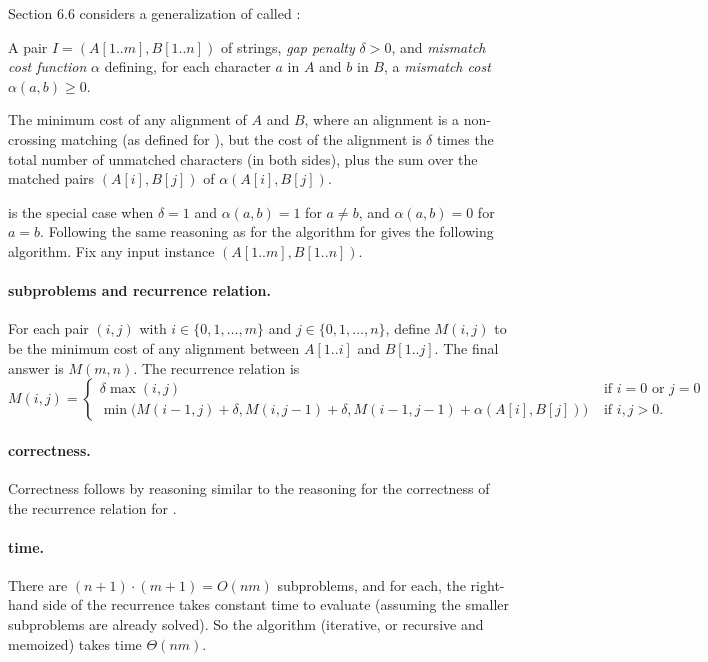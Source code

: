 \KT Section 6.6 considers a generalization of  called :

\begin{mylist}
\item[\bf input:]
  A pair $I=(A[1..m], B[1..n])$ of strings, \emph{gap penalty} $\delta>0$,
  and \emph{mismatch cost function} $\alpha$ defining,
  for each character $a$ in $A$ and $b$ in $B$,
  a \emph{mismatch cost} $\alpha(a, b)\ge 0$.

\item[\bf output:]
  The minimum cost of any alignment of $A$ and $B$,
  where an alignment is a non-crossing matching (as defined for ),
  but the cost of the alignment is $\delta$ times the total number of unmatched characters (in both sides),
  plus the sum over the matched pairs $(A[i], B[j])$ of $\alpha(A[i], B[j])$.
\end{mylist}
 is the special case when $\delta=1$
and $\alpha(a, b) = 1$ for $a\ne b$, and $\alpha(a, b) = 0$ for $a=b$.
Following the same reasoning as for the algorithm for 
gives the following algorithm.
Fix any input instance $(A[1..m], B[1..n])$.

\paragraph{subproblems and recurrence relation.}
For each pair $(i, j)$ with $i\in\{0,1,\ldots, m\}$ and $j\in\{0,1,\ldots,n\}$,
define $M(i, j)$ to be the minimum cost of any alignment between $A[1..i]$ and $B[1..j]$.
The final answer is $M(m, n)$.  The recurrence relation is
\[
  M(i, j) = \begin{cases}
    \delta \max(i, j) & \text{ if } i=0 \text{ or } j=0 \\
    \min \big(M(i-1, j) + \delta, M(i, j-1) + \delta, M(i-1, j-1) + \alpha(A[i], B[j])\big)  & \text{ if } i, j > 0.
  \end{cases}
\]

\paragraph{correctness.}  Correctness follows by reasoning similar to the reasoning
for the correctness of the recurrence relation for .

\paragraph{time.}
There are $(n+1)\cdot(m+1) = O(nm)$ subproblems,
and for each, the right-hand side of the recurrence takes
constant time to evaluate
(assuming the smaller subproblems are already solved).
So the algorithm (iterative, or recursive and memoized) takes time $\Theta(nm)$.


